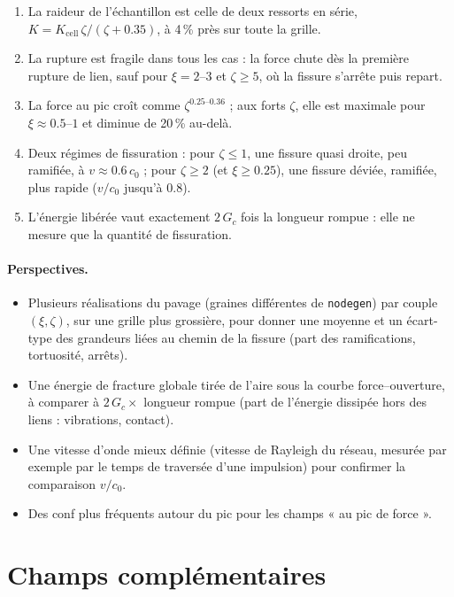 \documentclass[11pt,a4paper]{article}
\newcommand{\code}[1]{\texttt{#1}}
\newcommand{\Kcell}{K_{\mathrm{cell}}}
\begin{document}
\begin{enumerate}[nosep]
  \item La raideur de l'échantillon est celle de deux ressorts en série,
    $K=\Kcell\,\zeta/(\zeta+0.35)$, à 4\,\% près sur toute la grille.
  \item La rupture est fragile dans tous les cas : la force chute dès la première rupture de lien, sauf pour
    $\xi=2$--$3$ et $\zeta\geq 5$, où la fissure s'arrête puis repart.
  \item La force au pic croît comme $\zeta^{0.25\text{--}0.36}$ ; aux forts $\zeta$, elle est maximale pour
    $\xi\approx 0.5$--$1$ et diminue de 20\,\% au-delà.
  \item Deux régimes de fissuration : pour $\zeta\leq 1$, une fissure quasi droite, peu ramifiée, à
    $v\approx 0.6\,c_0$ ; pour $\zeta\geq 2$ (et $\xi\geq 0.25$), une fissure déviée, ramifiée, plus rapide
    ($v/c_0$ jusqu'à 0.8).
  \item L'énergie libérée vaut exactement $2\,G_c$ fois la longueur rompue : elle ne mesure que la quantité de
    fissuration.
\end{enumerate}

\paragraph{Perspectives.}
\begin{itemize}[nosep]
  \item Plusieurs réalisations du pavage (graines différentes de \code{nodegen}) par couple $(\xi,\zeta)$, sur
    une grille plus grossière, pour donner une moyenne et un écart-type des grandeurs liées au chemin de la
    fissure (part des ramifications, tortuosité, arrêts).
  \item Une énergie de fracture globale tirée de l'aire sous la courbe force--ouverture, à comparer à
    $2\,G_c\times$ longueur rompue (part de l'énergie dissipée hors des liens : vibrations, contact).
  \item Une vitesse d'onde mieux définie (vitesse de Rayleigh du réseau, mesurée par exemple par le temps de
    traversée d'une impulsion) pour confirmer la comparaison $v/c_0$.
  \item Des conf plus fréquents autour du pic pour les champs « au pic de force ».
\end{itemize}

\appendix
\section{Champs complémentaires}
\end{document}
